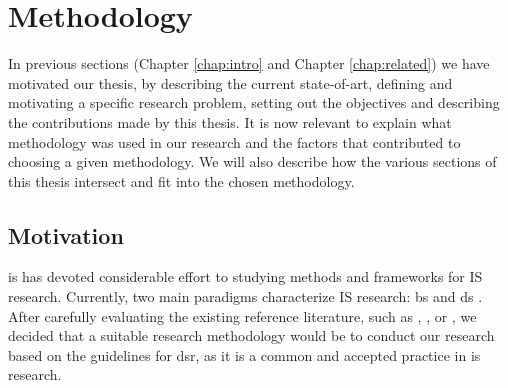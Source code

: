 \chapter{Methodology}

In previous sections (Chapter \ref{chap:intro} and Chapter \ref{chap:related}) we have motivated our thesis, by describing the current state-of-art, defining and motivating a specific research problem, setting out the objectives and describing the contributions made by this thesis. It is now relevant to explain what methodology was used in our research and the factors that contributed to choosing a given methodology. We will also describe how the various sections of this thesis intersect and fit into the chosen methodology.

\section{Motivation}

\gls{is} has devoted considerable effort to studying methods and frameworks for IS research. Currently, two main paradigms characterize IS research: \gls{bs} and \gls{ds} \cite[76]{hevner_design_2004}. After carefully evaluating the existing reference literature, such as \cite{hevner_design_2004}, \cite{march_design_1995}, \cite{winter_design_2008} or \cite{peffers_design_2007}, we decided that a suitable research methodology would be to conduct our research based on the guidelines for \gls{dsr}, as it is a common and accepted practice in \gls{is} research. 

